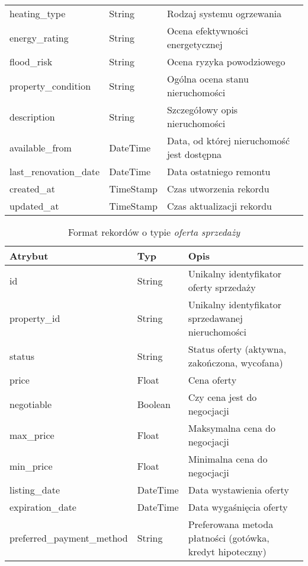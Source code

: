 \begin{table}[H]
\begin{tabularx}{\textwidth}{|l|l|X|}
    heating\_type & String & Rodzaj systemu ogrzewania \\
    energy\_rating & String & Ocena efektywności energetycznej \\
    flood\_risk & String & Ocena ryzyka powodziowego \\
    property\_condition & String & Ogólna ocena stanu nieruchomości \\
    description & String & Szczegółowy opis nieruchomości \\
    available\_from & DateTime & Data, od której nieruchomość jest dostępna \\
    last\_renovation\_date & DateTime & Data ostatniego remontu \\
    created\_at & TimeStamp & Czas utworzenia rekordu \\
    updated\_at & TimeStamp & Czas aktualizacji rekordu \\
    \hline
    \end{tabularx}
    \label{tab:property_details}
\end{table}

\begin{table}[H]
    \caption{Format rekordów o typie \textit{oferta sprzedaży}}
    \centering
    \begin{tabularx}{\textwidth}{|l|l|X|}
    \hline
    \textbf{Atrybut} & \textbf{Typ} & \textbf{Opis} \\
    \hline
    id & String & Unikalny identyfikator oferty sprzedaży \\
    property\_id & String & Unikalny identyfikator sprzedawanej nieruchomości \\
    status & String & Status oferty (aktywna, zakończona, wycofana) \\
    price & Float & Cena oferty \\
    negotiable & Boolean & Czy cena jest do negocjacji \\    
    max\_price & Float & Maksymalna cena do negocjacji \\
    min\_price & Float & Minimalna cena do negocjacji \\
    listing\_date & DateTime & Data wystawienia oferty \\
    expiration\_date & DateTime & Data wygaśnięcia oferty \\
    preferred\_payment\_method & String & Preferowana metoda płatności (gotówka, kredyt hipoteczny) \\
    \hline
    \end{tabularx}
    \label{tab:sell_offer_details}
\end{table}


